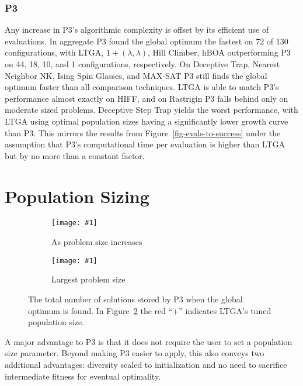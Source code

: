 \documentclass[twoside]{article}
\newcommand{\includegraphicsfit}[1]
{\texttt{[image: \#1]}}
\begin{document}
\subsubsection{P3}
Any increase in P3's algorithmic complexity is offset by its efficient use of evaluations.
In aggregate P3 found the global optimum the fastest on 72 of 130 configurations,
with LTGA, $1+(\lambda, \lambda)$, Hill Climber, hBOA outperforming P3 on 44, 18, 10, and 1 configurations, respectively.
On
Deceptive Trap, Nearest Neighbor NK, Ising Spin Glasses, and MAX-SAT P3 still finds the global
optimum faster than all comparison techniques. LTGA is able to match P3's performance almost exactly on HIFF,
and on Rastrigin P3 falls behind only on moderate sized problems. Deceptive Step Trap yields the worst performance,
with LTGA using optimal population sizes having a significantly lower growth curve than P3. This mirrors
the results from Figure~\ref{fig-evals-to-success} under the assumption that P3's computational time per evaluation is higher
than LTGA but by no more than a constant factor.

\section{Population Sizing}
\begin{figure}[t]
  \begin{centering}
    \begin{subfigure}{.5\textwidth}
      \begin{centering}
        \includegraphicsfit{pop-p3}
      \end{centering}
      \caption{As problem size increases}
      \label{fig-pop-p3}
    \end{subfigure}%
    \begin{subfigure}{.5\textwidth}
      \begin{centering}
        \includegraphicsfit{solutions-stored}
      \end{centering}
      \caption{Largest problem size}
      \label{fig-solutions-stored}
    \end{subfigure}
  \end{centering}
  \caption{The total number of solutions stored by P3 when the global optimum is found.
           In Figure~\ref{fig-solutions-stored} the red ``+'' indicates LTGA's tuned population size.}
  \label{fig-p3-storage}
\end{figure}

A major advantage to P3 is that it does not require the user to set a population size parameter.
Beyond making P3 easier to apply, this also conveys two additional advantages: diversity scaled
to initialization and no need to sacrifice intermediate fitness for eventual optimality.
\end{document}

